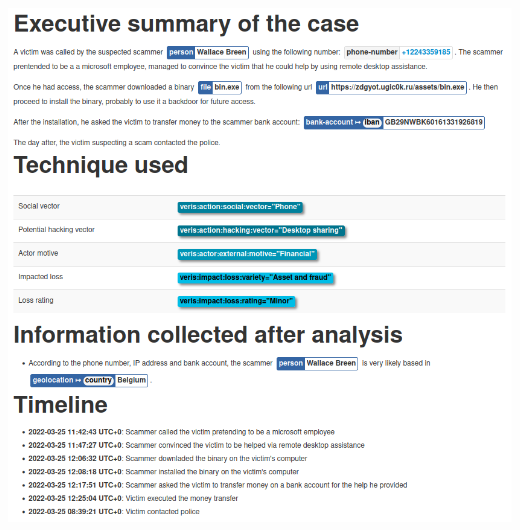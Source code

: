 \begin{frame}
    \vspace{-3pt}
    \begin{center}
        \includegraphics[width=0.64\linewidth]{pictures/case1/event-report.png}
    \end{center}
\end{frame}

